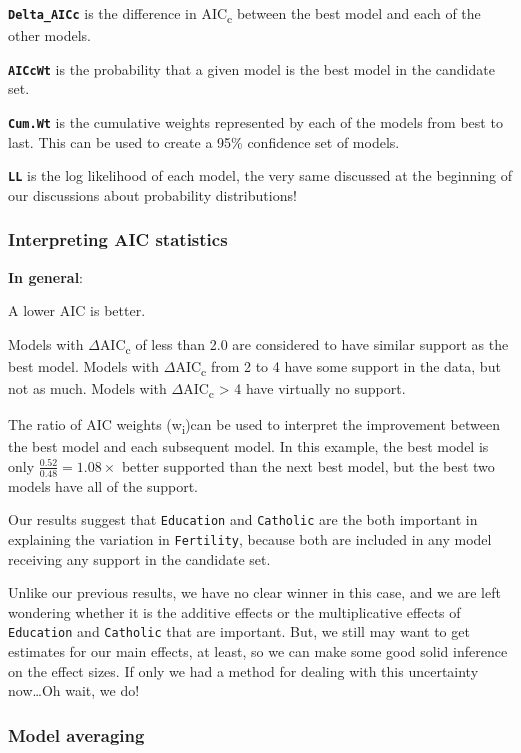 \documentclass[
]{book}
\begin{document}
\textbf{\texttt{Delta\_AICc}} is the difference in AIC\textsubscript{c} between the best model and each of the other models.

\textbf{\texttt{AICcWt}} is the probability that a given model is the best model in the candidate set.

\textbf{\texttt{Cum.Wt}} is the cumulative weights represented by each of the models from best to last. This can be used to create a 95\% confidence set of models.

\textbf{\texttt{LL}} is the log likelihood of each model, the very same discussed at the beginning of our discussions about probability distributions!

\hypertarget{interpreting-aic-statistics}{%
\subsubsection{Interpreting AIC statistics}\label{interpreting-aic-statistics}}

\textbf{In general}:

A lower AIC is better.

Models with \(\Delta\)AIC\textsubscript{c} of less than 2.0 are considered to have similar support as the best model. Models with \(\Delta\)AIC\textsubscript{c} from 2 to 4 have some support in the data, but not as much. Models with \(\Delta\)AIC\textsubscript{c} \textgreater{} 4 have virtually no support.

The ratio of AIC weights (w\textsubscript{i})can be used to interpret the improvement between the best model and each subsequent model. In this example, the best model is only \(\frac{0.52}{0.48} = 1.08 \times\) better supported than the next best model, but the best two models have all of the support.

Our results suggest that \texttt{Education} and \texttt{Catholic} are the both important in explaining the variation in \texttt{Fertility}, because both are included in any model receiving any support in the candidate set.

Unlike our previous results, we have no clear winner in this case, and we are left wondering whether it is the additive effects or the multiplicative effects of \texttt{Education} and \texttt{Catholic} that are important. But, we still may want to get estimates for our main effects, at least, so we can make some good solid inference on the effect sizes. If only we had a method for dealing with this uncertainty now\ldots Oh wait, we do!

\hypertarget{model-averaging}{%
\subsubsection{Model averaging}\label{model-averaging}}
\end{document}
